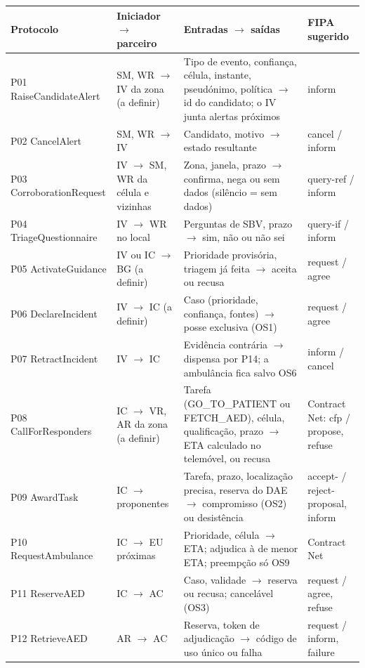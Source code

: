 \documentclass[10pt,a4paper]{article}
\begin{document}
{\small
\begin{xltabular}{\linewidth}{@{}P{3.1cm}P{3.1cm}LP{2.3cm}@{}}
\toprule
Protocolo & Iniciador $\rightarrow$ parceiro & Entradas $\rightarrow$ saídas & FIPA sugerido \\
\midrule
\endhead
P01 RaiseCandidateAlert & SM, WR $\rightarrow$ IV da zona (a definir) & Tipo de evento, confiança, célula, instante, pseudónimo, política $\rightarrow$ id do candidato; o IV junta alertas próximos & inform \\
P02 CancelAlert & SM, WR $\rightarrow$ IV & Candidato, motivo $\rightarrow$ estado resultante & cancel / inform \\
P03 CorroborationRequest & IV $\rightarrow$ SM, WR da célula e vizinhas & Zona, janela, prazo $\rightarrow$ confirma, nega ou sem dados (silêncio = sem dados) & query-ref / inform \\
P04 TriageQuestionnaire & IV $\rightarrow$ WR no local & Perguntas de SBV, prazo $\rightarrow$ sim, não ou não sei & query-if / inform \\
P05 ActivateGuidance & IV ou IC $\rightarrow$ BG (a definir) & Prioridade provisória, triagem já feita $\rightarrow$ aceita ou recusa & request / agree \\
P06 DeclareIncident & IV $\rightarrow$ IC (a definir) & Caso (prioridade, confiança, fontes) $\rightarrow$ posse exclusiva (OS1) & request / agree \\
P07 RetractIncident & IV $\rightarrow$ IC & Evidência contrária $\rightarrow$ dispensa por P14; a ambulância fica salvo OS6 & inform / cancel \\
P08 CallForResponders & IC $\rightarrow$ VR, AR da zona (a definir) & Tarefa (GO\_TO\_PATIENT ou FETCH\_AED), célula, qualificação, prazo $\rightarrow$ ETA calculado no telemóvel, ou recusa & Contract Net: cfp / propose, refuse \\
P09 AwardTask & IC $\rightarrow$ proponentes & Tarefa, prazo, localização precisa, reserva do DAE $\rightarrow$ compromisso (OS2) ou desistência & accept- / reject-proposal, inform \\
P10 RequestAmbulance & IC $\rightarrow$ EU próximas & Prioridade, célula $\rightarrow$ ETA; adjudica à de menor ETA; preempção só OS9 & Contract Net \\
P11 ReserveAED & IC $\rightarrow$ AC & Caso, validade $\rightarrow$ reserva ou recusa; cancelável (OS3) & request / agree, refuse \\
P12 RetrieveAED & AR $\rightarrow$ AC & Reserva, token de adjudicação $\rightarrow$ código de uso único ou falha & request / inform, failure \\
\bottomrule
\end{xltabular}
}
\end{document}
